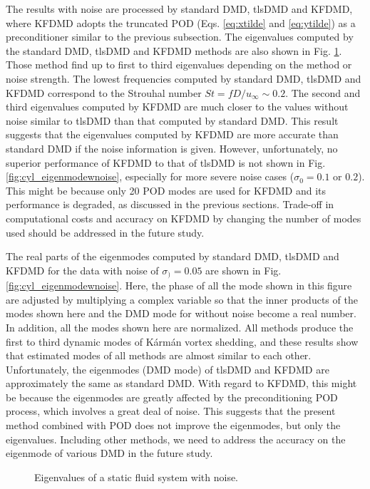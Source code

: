 \documentclass[aip,graphicx]{revtex4-1}
\begin{document}
The results with noise are processed by standard DMD, tlsDMD and KFDMD, where KFDMD adopts the truncated POD (Eqs. \ref{eq:xtilde} and \ref{eq:ytilde}) as a preconditioner similar to the previous subsection. The eigenvalues computed by the standard DMD, tlsDMD and KFDMD methods are also shown in Fig. \ref{fig:cyl_eigenwnoise}. Those method find up to first to third eigenvalues depending on the method or noise strength. The lowest frequencies computed by standard DMD, tlsDMD and KFDMD correspond to the Strouhal number $St=fD/u_\infty \sim 0.2$.  The second and third eigenvalues computed by KFDMD are much closer to the values without noise similar to tlsDMD than  that computed by standard DMD. This result suggests that the eigenvalues computed by KFDMD are more accurate than standard DMD if the noise information is given. However, unfortunately, no superior performance of KFDMD to that of tlsDMD is not shown in Fig. \ref{fig:cyl_eigenmodewnoise}, especially for more severe noise cases ($\sigma_0=0.1$ or $0.2$). This might be because only 20 POD modes are used for KFDMD and its performance is degraded, as discussed in the previous sections. Trade-off in computational costs and accuracy on KFDMD by changing the number of modes used should be addressed in the future study. 

The real parts of the eigenmodes computed by standard DMD, tlsDMD and KFDMD for the data with noise of $\sigma_)=0.05$ are shown in Fig. \ref{fig:cyl_eigenmodewnoise}. Here, the phase of all the mode shown in this figure are adjusted by multiplying a complex variable so that the inner products of the modes shown here and the DMD mode for without noise become a real number. In addition, all the modes shown here are normalized.  All methods produce the first to third dynamic modes of K\'arm\'an vortex shedding, and these results show that estimated modes of all methods are almost similar to each other. Unfortunately, the eigenmodes (DMD mode) of tlsDMD and KFDMD are approximately the same as standard DMD. With regard to KFDMD, this might be because the eigenmodes are greatly affected by the preconditioning POD process, which involves a great deal of noise. This suggests that the present method combined with POD does not improve the eigenmodes, but only the eigenvalues. Including other methods, we need to address the accuracy on the eigenmode of various DMD in the future study. 

\begin{figure}
	\caption{Eigenvalues of a static fluid system with noise.}
	\label{fig:cyl_eigenwnoise}
\end{figure}
\end{document}
